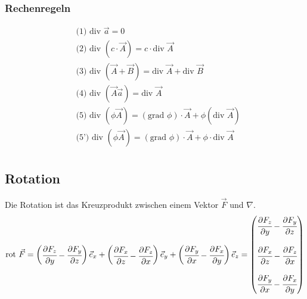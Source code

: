 \documentclass[a4paper,10pt]{scrartcl}
\begin{document}
        \subsubsection*{Rechenregeln}
        \begin{equation*}
            \begin{aligned}
                & \text{(1) } \text{div } \vec{a} = 0 \\
                & \text{(2) } \text{div } (c \cdot \vec{A}) = c \cdot \text{div } \vec{A} \\
                & \text{(3) } \text{div } (\vec{A} + \vec{B}) = \text{div } \vec{A} + \text{div } \vec{B} \\
                & \text{(4) } \text{div } (\vec{A} \vec{a}) = \text{div } \vec{A} \\
                & \text{(5) } \text{div } (\phi \vec{A})= (\text{grad } \phi) \cdot \vec{A} + \phi(\text{div } \vec{A}) \\
                & \text{(5') } \text{div } (\phi \vec{A})= (\text{grad } \phi) \cdot \vec{A} + \phi \cdot \text{div } \vec{A} \\
            \end{aligned}
        \end{equation*}

        \subsection{Rotation}
        Die Rotation ist das Kreuzprodukt zwischen einem Vektor \(\vec{F}\) und \(\nabla\). 
        \begin{equation*}
            \text{rot } \vec{F} = \begin{pmatrix}
                \cfrac{\partial F_z}{\partial y}  - \cfrac{ \partial F_y}{\partial z}
            \end{pmatrix} \vec{e}_x + 
            \begin{pmatrix}
                \cfrac{\partial F_x}{\partial z}  - \cfrac{ \partial F_z}{\partial x}
            \end{pmatrix} \vec{e}_y +
            \begin{pmatrix}
                \cfrac{\partial F_y}{\partial x}  - \cfrac{ \partial F_x}{\partial y}
            \end{pmatrix} \vec{e}_z =            
            \begin{pmatrix}
                \cfrac{\partial F_z}{\partial y}  - \cfrac{ \partial F_y}{\partial z} \\
                \\
                \cfrac{\partial F_x}{\partial z}  - \cfrac{ \partial F_z}{\partial x} \\ \\
                \cfrac{\partial F_y}{\partial x}  - \cfrac{ \partial F_x}{\partial y}
            \end{pmatrix}
        \end{equation*}
\end{document}
